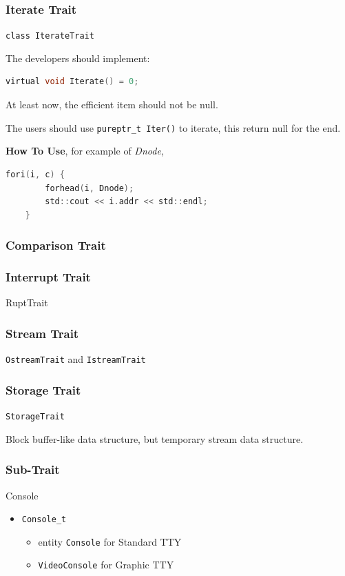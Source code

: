 \subsubsection{Iterate Trait}

\verb|class IterateTrait|

The developers should implement:

\begin{lstlisting}[language=C]
	virtual void Iterate() = 0;
\end{lstlisting}

At least now, the efficient item should not be null.

The users should use \verb|pureptr_t Iter()| to iterate, this return null for the end.

\textbf{How To Use}, for example of \textit{Dnode},

\begin{lstlisting}[language=C]
	fori(i, c) {
		forhead(i, Dnode);
		std::cout << i.addr << std::endl;
	}
\end{lstlisting}



\subsubsection{Comparison Trait}



\subsubsection{Interrupt Trait}

RuptTrait



\subsubsection{Stream Trait}

\verb|OstreamTrait| and \verb|IstreamTrait|



\subsubsection{Storage Trait}

\verb|StorageTrait|

Block buffer-like data structure, but temporary stream data structure.



\subsubsection{Sub-Trait}

Console

\begin{itemize}

\item \verb|Console_t|
\begin{itemize}

\item entity \verb|Console| for Standard TTY
\item \verb|VideoConsole| for Graphic TTY
\end{itemize}

\end{itemize}

